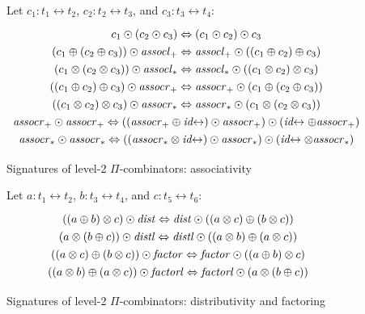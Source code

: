 \documentclass{article}
\newcommand{\assoclp}{\mathit{assocl}_+}
\newcommand{\assocrp}{\mathit{assocr}_+}
\newcommand{\assoclt}{\mathit{assocl}_*}
\newcommand{\assocrt}{\mathit{assocr}_*}
\newcommand{\dist}{\mathit{dist}}
\newcommand{\factor}{\mathit{factor}}
\newcommand{\distl}{\mathit{distl}}
\newcommand{\factorl}{\mathit{factorl}}
\newcommand{\idc}{\mathit{id}\!\!\leftrightarrow}
\begin{document}
\begin{figure}[t]
Let $c_1 : t_1 \leftrightarrow t_2$,  $c_2 : t_2 \leftrightarrow t_3$, and $c_3 : t_3 \leftrightarrow t_4$:
\[\def\arraystretch{1.3}
\begin{array}{c}
  {c_1 \odot (c_2 \odot c_3) \Leftrightarrow (c_1 \odot c_2) \odot c_3}
\\
  {(c_1 \oplus (c_2 \oplus c_3)) \odot \assoclp \Leftrightarrow \assoclp \odot ((c_1 \oplus c_2) \oplus c_3)}
\\
  {(c_1 \otimes (c_2 \otimes c_3)) \odot \assoclt \Leftrightarrow \assoclt \odot ((c_1 \otimes c_2) \otimes c_3)}
\\
  {((c_1 \oplus c_2) \oplus c_3) \odot \assocrp \Leftrightarrow \assocrp \odot (c_1 \oplus (c_2 \oplus c_3))}
\\
  {((c_1 \otimes c_2) \otimes c_3) \odot \assocrt \Leftrightarrow \assocrt \odot (c_1 \otimes (c_2 \otimes c_3))}
\\
  {\assocrp \odot \assocrp \Leftrightarrow ((\assocrp \oplus \idc) \odot \assocrp) \odot (\idc \oplus \assocrp)}
\\
  {\assocrt \odot \assocrt \Leftrightarrow ((\assocrt \otimes \idc) \odot \assocrt) \odot (\idc \otimes \assocrt)}
\end{array}\]
\caption{\label{figj}Signatures of level-2 $\Pi$-combinators: associativity}
\end{figure}

\begin{figure}[t]
Let $a : t_1 \leftrightarrow t_2$, $b : t_3 \leftrightarrow t_4$, and $c : t_5 \leftrightarrow t_6$:
\[\def\arraystretch{1.3}
\begin{array}{c}
  {((a \oplus b) \otimes c) \odot \dist \Leftrightarrow \dist \odot ((a \otimes c) \oplus (b \otimes c))}
\\
  {(a \otimes (b \oplus c)) \odot \distl \Leftrightarrow \distl \odot ((a \otimes b) \oplus (a \otimes c))}
\\
  {((a \otimes c) \oplus (b \otimes c)) \odot \factor \Leftrightarrow \factor \odot ((a \oplus b) \otimes c)}
\\
  {((a \otimes b) \oplus (a \otimes c)) \odot \factorl \Leftrightarrow \factorl \odot (a \otimes (b \oplus c))}
\end{array}\]
\caption{\label{figi}Signatures of level-2 $\Pi$-combinators: distributivity and factoring}
\end{figure}
\end{document}
